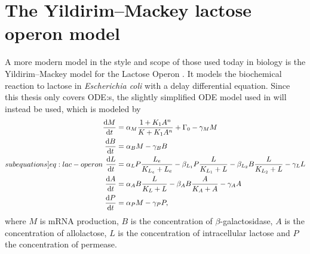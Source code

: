 \section{The Yildirim--Mackey lactose operon model}

A more modern model in the style and scope of those used today in biology is the Yildirim--Mackey model for the Lactose Operon \cite{yildirim2003feedback}.
It models the biochemical reaction to lactose in \textit{Escherichia coli} with a delay differential equation.
Since this thesis only covers ODE:s, the slightly simplified ODE model used in \cite{yildirim2011deterministic} will instead be used, which is modeled by
\begin{subequations} \label[subequations]{eq:lac-operon}
  \begin{align}
    \diff{M}{t} &= \alpha_M \frac{1 + K_1 A^n}{K + K_1 A^n} + \Gamma_0 - \gamma_M M \label{eq:lac-operon-a}\\
    \diff{B}{t} &= \alpha_B M - \gamma_B B \\
    \diff{L}{t} &= \alpha_L P \frac{L_e}{K_{L_e} + L_e} - \beta_{L_1} P \frac{L}{K_{L_1} + L} - \beta_{L_2} B \frac{L}{K_{L_2} + L} - \gamma_L L \\
    \diff{A}{t} &= \alpha_A B \frac{L}{K_L + L} - \beta_A B \frac{A}{K_A + A} - \gamma_A A \\
    \diff{P}{t} &= \alpha_P M - \gamma_P P,
  \end{align}
\end{subequations}
where \(M\) is mRNA production, \(B\) is the concentration of \(\beta\)-galactosidase, \(A\) is the concentration of allolactose, \(L\) is the concentration of intracellular lactose and \(P\) the concentration of permease.
